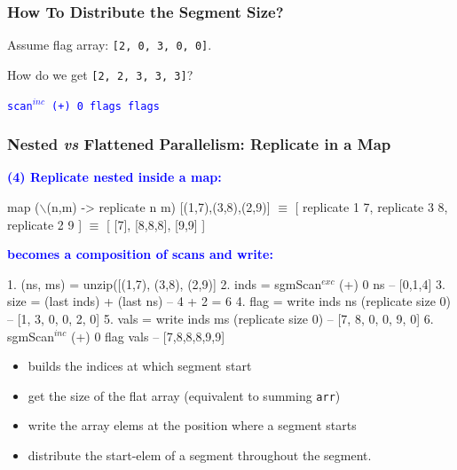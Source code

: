 \documentclass{beamer}
\newcommand{\blue}[1]{\textcolor{Blue}{{#1}}}
\renewcommand{\emph}[1]{\textcolor{structure}{#1}}
\newcommand{\emp}[1]{\textcolor{DikuRed}{ #1}}
\newcommand{\mymath}[1]{$ #1 $}
\newcommand{\myindu}[1]{^{#1}}
\begin{document}
\begin{frame}[fragile,t]
  \frametitle{How To Distribute the Segment Size?}

Assume flag array: \emph{\tt [2, 0, 3, 0, 0]}.

\bigskip

How do we get \emp{\tt [2, 2, 3, 3, 3]}?

\bigskip
\pause

\blue{\tt scan\mymath{\myindu{inc}} (+) 0 flags flags}

\end{frame}


\begin{frame}[fragile,t]
  \frametitle{Nested {\it vs} Flattened Parallelism: Replicate in a Map}

\blue{\bf (4) Replicate nested inside a map:}

\begin{colorcode}[fontsize=\scriptsize]
map (\mymath{\backslash}(n,m) -> replicate n m) \emp{[(1,7),(3,8),(2,9)]} \mymath{\equiv}
[ replicate 1 7, replicate 3 8, replicate 2 9 ] \mymath{\equiv}
[ [7], [8,8,8], [9,9] ]
\end{colorcode}

\bigskip
\pause

\blue{\bf becomes a composition of scans and write:}
\bigskip

\begin{colorcode}[fontsize=\scriptsize]
1. (ns, ms)  = unzip([(1,7), (3,8), (2,9)]
2. inds = sgmScan\mymath{\myindu{exc}} (+) 0 ns                   -- [0,1,4]
3. size = (last inds) + (last ns)               -- 4 + 2 = 6
4. flag = write inds  ns  (replicate size 0)    -- [1, 3, 0, 0, 2, 0]
5. vals = write inds  ms  (replicate size 0)    -- [7, 8, 0, 0, 9, 0]
6. sgmScan\mymath{\myindu{inc}} (+) 0 flag \emp{vals}                    \emph{-- [7,8,8,8,9,9]}
\end{colorcode}

\bigskip

\begin{itemize}
    \item[2.] builds the indices at which segment start
    \item[3.] get the size of the flat array (equivalent to summing {\tt arr})
    \item[4-5.] write the array elems at the position where a segment starts
    \item[6.] distribute the start-elem of a segment throughout the segment.  
\end{itemize}

\end{frame}
\end{document}
